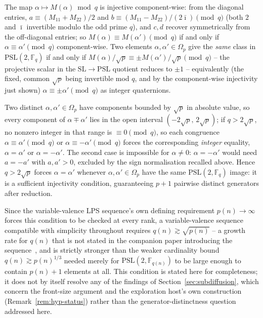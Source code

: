 \documentclass[11pt,a4paper]{article}
\theoremstyle{definition}
\theoremstyle{remark}
\begin{document}
    The map $\alpha \mapsto M(\alpha) \bmod q$ is injective component-wise: from the diagonal
    entries, $a \equiv (M_{11}+M_{22})/2$ and $b \equiv (M_{11}-M_{22})/(2\bar\imath) \pmod q$
    (both $2$ and $\bar\imath$ invertible modulo the odd prime $q$), and $c,d$ recover
    symmetrically from the off-diagonal entries; so $M(\alpha)\equiv M(\alpha')\pmod q$ if and
    only if $\alpha\equiv\alpha'\pmod q$ component-wise.
    Two elements $\alpha,\alpha'\in\Omega_p$ give the \emph{same} class in
    $\mathrm{PSL}(2,\mathbb F_q)$ if and only if $M(\alpha)/\sqrt p \equiv \pm
    M(\alpha')/\sqrt p \pmod q$ -- the projective scalar in the $\mathrm{SL}\to\mathrm{PSL}$
    quotient reduces to $\pm1$ -- equivalently (the fixed, common $\sqrt p$ being invertible
    mod $q$, and by the component-wise injectivity just shown) $\alpha \equiv \pm\alpha'
    \pmod q$ as integer quaternions.

    Two distinct $\alpha,\alpha' \in \Omega_p$ have components bounded by $\sqrt p$ in
    absolute value, so every component of $\alpha \mp \alpha'$ lies in the open interval
    $(-2\sqrt p,\, 2\sqrt p)$; if $q > 2\sqrt p$, no nonzero integer in that range is
    $\equiv 0 \pmod q$, so each congruence $\alpha\equiv\alpha'\pmod q$ or
    $\alpha\equiv-\alpha'\pmod q$ forces the corresponding \emph{integer} equality,
    $\alpha=\alpha'$ or $\alpha=-\alpha'$.
    The second case is impossible for $\alpha\neq0$: $\alpha=-\alpha'$ would need $a=-a'$ with
    $a,a'>0$, excluded by the sign normalisation recalled above.
    Hence $q > 2\sqrt p$ forces $\alpha=\alpha'$ whenever $\alpha,\alpha'\in\Omega_p$ have the
    same $\mathrm{PSL}(2,\mathbb F_q)$ image: it is a sufficient injectivity condition,
    guaranteeing $p+1$ pairwise distinct generators after reduction.

    Since the variable-valence LPS sequence's own defining requirement $p(n) \to \infty$
    forces this condition to be checked at every rank, a variable-valence sequence compatible with
    simplicity throughout requires $q(n) \gtrsim \sqrt{p(n)}$ -- a growth rate for $q(n)$ that
    is not stated in the companion paper introducing the sequence~\cite{Beau2026a6}, and is
    strictly stronger than the weaker cardinality bound $q(n) \gtrsim p(n)^{1/3}$ needed merely
    for $\mathrm{PSL}(2,\mathbb F_{q(n)})$ to be large enough to contain $p(n)+1$ elements at
    all.
    This condition is stated here for completeness; it does not by itself resolve any of the
    findings of Section~\ref{sec:subdiffusion}, which concern the front-size argument and the
    exploration host's own construction (Remark~\ref{rem:hyp-status}) rather than the
    generator-distinctness question addressed here.
\end{document}
